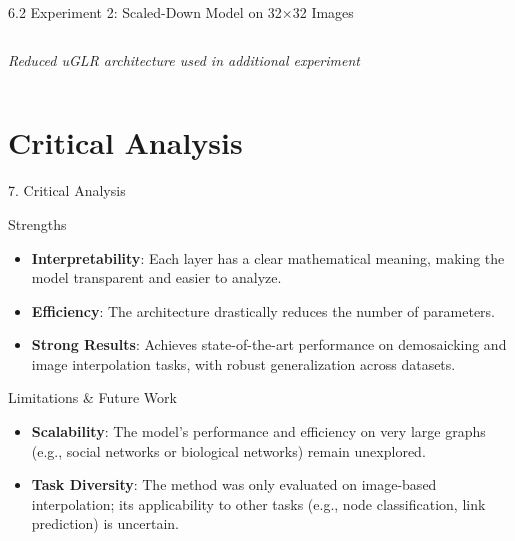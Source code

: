 \documentclass[aspectratio=169,xcolor=dvipsnames]{beamer}
\begin{document}
\begin{frame}{6.2 Experiment 2: Scaled-Down Model on 32×32 Images}
\begin{columns}[T]
\begin{column}{0.55\textwidth}
\begin{center}
\tiny \textit{Reduced uGLR architecture used in additional experiment}
\end{center}
\end{column}

\end{columns}
\end{frame}

\section{Critical Analysis}

\begin{frame}{7. Critical Analysis}

    \begin{exampleblock}{Strengths}
        \begin{itemize}
            \item \textbf{Interpretability}: Each layer has a clear mathematical meaning, making the model transparent and easier to analyze.
            
            \item \textbf{Efficiency}: The architecture drastically reduces the number of parameters.
            
            \item \textbf{Strong Results}: Achieves state-of-the-art performance on demosaicking and image interpolation tasks, with robust generalization across datasets.
        \end{itemize}
    \end{exampleblock}

    \begin{alertblock}{Limitations \& Future Work}
        \begin{itemize}
            \item \textbf{Scalability}: The model’s performance and efficiency on very large graphs (e.g., social networks or biological networks) remain unexplored.
            
            \item \textbf{Task Diversity}: The method was only evaluated on image-based interpolation; its applicability to other tasks (e.g., node classification, link prediction) is uncertain.
            
        \end{itemize}
    \end{alertblock}

\end{frame}
\end{document}
